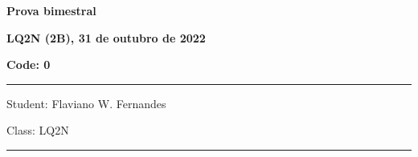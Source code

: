 \documentclass[12pt, addpoints]{exam}
\begin{document}
    \begin{minipage}[b]{0.75\linewidth}
        \begin{flushleft}
            {\bf \large Prova bimestral}
        \end{flushleft}
        \begin{flushleft}
            {\bf \large LQ2N (2B), 31 de outubro de 2022}
        \end{flushleft}
    \end{minipage}
    \begin{minipage}[b]{0.20\linewidth}
        \begin{flushright}
            {\bf \large Code: 0}
        \end{flushright}
    \end{minipage}
    \vspace{0.5cm} \hrule \vspace{0.5cm}
    \begin{minipage}{0.75\linewidth}
        \begin{flushleft}
            Student: Flaviano W. Fernandes
        \end{flushleft}
    \end{minipage}
    \begin{minipage}{0.20\linewidth}
        \begin{flushright}
            Class: LQ2N
        \end{flushright}
    \end{minipage}
    \vspace{0.5cm} \hrule \vspace{0.5cm}
\end{document}
